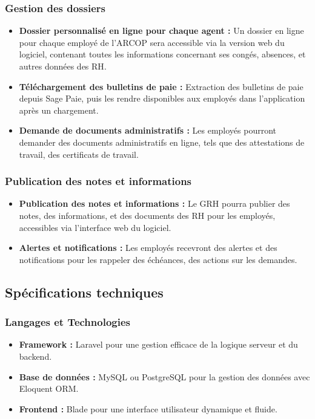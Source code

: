 \subsubsection{Gestion des dossiers}
\begin{itemize}
    \item \textbf{Dossier personnalisé en ligne pour chaque agent :} Un dossier en ligne pour chaque employé de l'\ac{ARCOP} sera accessible via la version web du logiciel, contenant toutes les informations concernant ses congés, absences, et autres données des \ac{RH}.
    
    \item \textbf{Téléchargement des bulletins de paie :} Extraction des bulletins de paie depuis Sage Paie, puis les rendre disponibles aux employés dans l'application après un chargement.
    \item \textbf{Demande de documents administratifs :} Les employés
    pourront demander des documents administratifs en ligne, tels que des attestations de travail, des certificats de travail.
\end{itemize}

\subsubsection{Publication des notes et informations}
\begin{itemize}
    \item \textbf{Publication des notes et informations :} Le GRH pourra publier des notes, des informations, et des documents des \ac{RH} pour les employés, accessibles via l'interface web du logiciel.
    \item \textbf{Alertes et notifications :} Les employés recevront des alertes et des notifications pour les rappeler des échéances, des actions sur les demandes.
\end{itemize}

\subsection{Spécifications techniques}

\subsubsection{Langages et Technologies}
\begin{itemize}
    \item \textbf{Framework :} Laravel pour une gestion efficace de la logique serveur et du backend.
    \item \textbf{Base de données :} MySQL ou PostgreSQL pour la gestion des données avec Eloquent ORM.
    \item \textbf{Frontend :} Blade pour une interface utilisateur dynamique et fluide.

\end{itemize}


